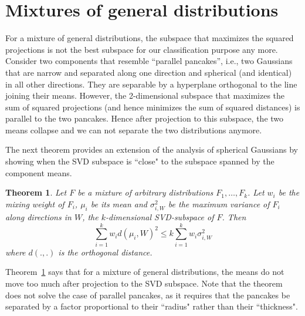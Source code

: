 \documentclass{book}
\newtheorem{theorem}{Theorem}[chapter]
\numberwithin{exercise}{chapter}
\begin{document}
\section{Mixtures of general distributions}\label{sec:genmix}
For a mixture of general distributions, the subspace that maximizes the squared projections is not the best subspace for our classification purpose any more. Consider two components that resemble ``parallel pancakes'', i.e., two Gaussians that are narrow and separated along one direction and spherical (and identical) in all other directions. They are separable by a hyperplane orthogonal to the line joining their means. However, the 2-dimensional subspace that maximizes the sum of squared projections (and hence minimizes the sum of squared distances)
is parallel to the two pancakes. Hence after projection to this subspace, the two means collapse and we can not separate
the two distributions anymore.



The next theorem provides an extension of the analysis of spherical Gaussians by showing when the SVD subspace is ``close" to the subspace spanned by the component means.

\begin{theorem}\label{thm:genmix}
Let $F$ be a mixture of arbitrary distributions $F_1,\ldots,F_k$. Let $w_i$ be the mixing weight
of $F_i$, $\mu_i$ be its mean and $\sigma^2_{i,W}$ be the maximum variance of $F_i$ along directions in $W$, the $k$-dimensional SVD-subspace of $F$. Then
\[\sum_{i=1}^k w_i d(\mu_i,W)^2 \le k \sum_{i=1}^k w_i \sigma^2_{i,W}\]
where $d(.,.)$ is the orthogonal distance.
\end{theorem}

 Theorem~\ref{thm:genmix} says that for a mixture of general distributions, the means do not move too much after projection
 to the SVD subspace. Note that the theorem does not solve the case of parallel pancakes, as it requires that the pancakes be separated by a factor proportional to their ``radius" rather than their ``thickness".
\end{document}
